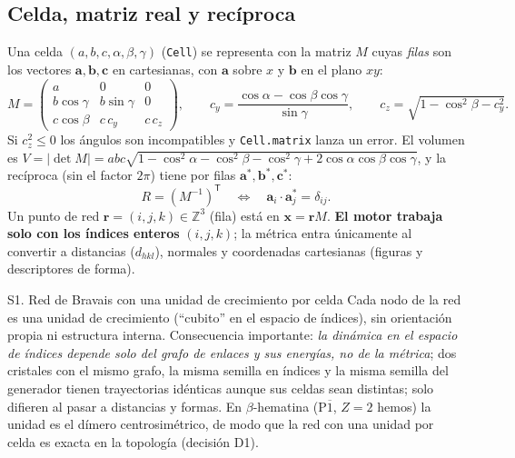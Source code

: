 \documentclass[11pt,a4paper]{article}
\newcommand{\code}[1]{\texttt{#1}}
\newcommand{\vect}[1]{\mathbf{#1}}
\newcommand{\bh}{$\beta$-hematina}
\begin{document}
\subsection{Celda, matriz real y recíproca}

Una celda $(a,b,c,\alpha,\beta,\gamma)$ (\code{Cell}) se representa con la matriz $M$ cuyas
\emph{filas} son los vectores $\vect a,\vect b,\vect c$ en cartesianas, con $\vect a$ sobre $x$ y
$\vect b$ en el plano $xy$:
\begin{equation}
M=\begin{pmatrix} a & 0 & 0\\ b\cos\gamma & b\sin\gamma & 0\\ c\cos\beta & c\,c_y & c\,c_z\end{pmatrix},
\qquad c_y=\frac{\cos\alpha-\cos\beta\cos\gamma}{\sin\gamma},\qquad c_z=\sqrt{1-\cos^2\beta-c_y^2}.
\label{eq:M}
\end{equation}
Si $c_z^2\le 0$ los ángulos son incompatibles y \code{Cell.matrix} lanza un error. El volumen es
$V=|\det M|=abc\sqrt{1-\cos^2\alpha-\cos^2\beta-\cos^2\gamma+2\cos\alpha\cos\beta\cos\gamma}$, y la
recíproca (sin el factor $2\pi$) tiene por filas $\vect a^*,\vect b^*,\vect c^*$:
\begin{equation}
R=(M^{-1})^{\mathsf T}\quad\Longleftrightarrow\quad \vect a_i\cdot\vect a^*_j=\delta_{ij}.
\label{eq:R}
\end{equation}
Un punto de red $\vect r=(i,j,k)\in\mathbb Z^3$ (fila) está en $\vect x=\vect r M$. \textbf{El motor
trabaja solo con los índices enteros} $(i,j,k)$; la métrica entra únicamente al convertir a
distancias ($d_{hkl}$), normales y coordenadas cartesianas (figuras y descriptores de forma).

\begin{supuesto}{S1. Red de Bravais con una unidad de crecimiento por celda}
Cada nodo de la red es una unidad de crecimiento (``cubito'' en el espacio de índices), sin
orientación propia ni estructura interna. Consecuencia importante: \emph{la dinámica en el espacio de
índices depende solo del grafo de enlaces y sus energías, no de la métrica}; dos cristales con el
mismo grafo, la misma semilla en índices y la misma semilla del generador tienen trayectorias idénticas
aunque sus celdas sean distintas; solo difieren al pasar a distancias y formas. En \bh{} (P$\overline1$, $Z=2$ hemos) la unidad es el dímero centrosimétrico,
de modo que la red con una unidad por celda es exacta en la topología (decisión D1).
\end{supuesto}
\end{document}
